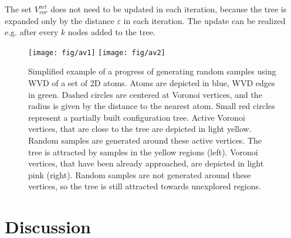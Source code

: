 \documentclass{llncs}
\def\qnear{q_{near}}
\def\VVA{V_{vor}^{act}}
\begin{document}
The set $\VVA$ does not need to be updated in each iteration, because the tree is expanded only by the distance $\varepsilon$ in each
iteration. 
The update can be realized e.g. after every $k$ nodes added to the tree.



\begin{figure}
\centering
\texttt{[image: fig/av1]}
\texttt{[image: fig/av2]}
\caption{\label{fig::av}
    Simplified example of a progress of generating random samples using WVD of a set of 2D atoms.
    Atoms are depicted in blue, WVD edges in green.
    Dashed circles are centered at Voronoi vertices, and the radius is given by the distance to the nearest atom.
    Small red circles represent a partially built configuration tree.
    Active Voronoi vertices, that are close to the tree are depicted in light yellow.
    Random samples are generated around these active vertices.
    The tree is attracted by samples in the yellow regions (left). 
    Voronoi vertices, that have been already approached, are depicted in light pink (right).
    Random samples are not generated around these vertices, so the tree is still attracted towards unexplored regions.
}
\end{figure}

\section{Discussion}

\end{document}
